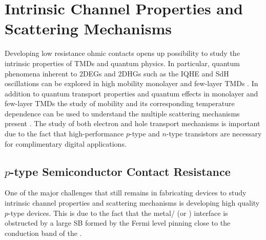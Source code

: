 \chapter{Intrinsic Channel Properties and Scattering Mechanisms}\label{chap:results}
Developing low resistance ohmic contacts opens up possibility to study the intrinsic properties of \acp{TMD} and quantum physics. In particular, quantum phenomena inherent to \acp{2DEG} and \acp{2DHG} such as the \ac{IQHE} and \ac{SdH} oscillations can be explored in high mobility monolayer and few-layer \acp{TMD} \cite{Cui_NatureNano2015}. In addition to quantum transport properties and quantum effects in monolayer and few-layer \acp{TMD} the study of mobility and its corresponding temperature dependence can be used to understand the multiple scattering mechanisms present \cite{Kaasbjerg_PhysRevB2012}. The study of both electron and hole transport mechanisms is important due to the fact that high-performance $p$-type and $n$-type transistors are necessary for complimentary digital applications. 

\section{$p$-type  Semiconductor Contact Resistance}\label{sec:pWSe2_contacts}
One of the major challenges that still remains in fabricating devices to study intrinsic channel properties and scattering mechanisms is developing high quality $p$-type  devices. This is due to the fact that the metal/ (or ) interface is obstructed by a large \ac{SB} formed by the Fermi level pinning close to the conduction band of the  \cite{Chuang_NanoLett2014,Das_NanoLett2012}. \\ \\

